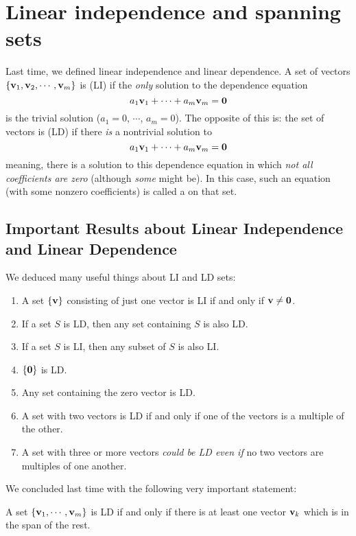 \chapter{Linear independence and spanning sets}

\label{Chapter:08independence_span}

Last time, we defined linear independence and linear dependence.
A set of vectors $\{ \mathbf{v}_1, \mathbf{v}_2, \cdots, \mathbf{v}_m\}$ 
is  (LI) if the \emph{only}
solution to the dependence equation
$$
a_1\mathbf{v}_1+\cdots +a_m\mathbf{v}_m = \mathbf{0}
$$
is the trivial solution ($a_1=0$, $\cdots$, $a_m=0$).  The opposite
of this is:  the set of vectors is  (LD)
if there \emph{is} a nontrivial solution to 
$$
a_1\mathbf{v}_1+\cdots +a_m\mathbf{v}_m = \mathbf{0}
$$
meaning, there is a solution to this dependence equation in which
\emph{not all coefficients are zero} (although \emph{some} might
be).  In this case, such an equation (with some nonzero coefficients)
is called a  on that set.

\section{Important Results about Linear Independence and Linear Dependence}

We deduced many useful things about LI and LD sets:
\begin{enumerate}
\item A set $\{ \mathbf{v}\}$ consisting of just one vector is LI if and only if $\mathbf{v} \neq \mathbf{0}$.
\item If a set $S$ is LD, then any set containing $S$ is also LD.
\item If a set $S$ is LI, then any subset of $S$ is also LI.
\item $\{\mathbf{0}\}$ is LD.
\item Any set containing the zero vector is LD. 
\item A set with two vectors is LD if and only if one of the vectors
is a multiple of the other.
\item A set with three or more vectors \emph{could be LD even if} no
two vectors are multiples of one another.
\end{enumerate}

We concluded last time with the following very important statement:

\begin{theorem}\label{depspan} 
A set $\{\mathbf{v}_1, \cdots, \mathbf{v}_m\}$ is LD if and only if there is at least
one vector $\mathbf{v}_k$  which is in the span of the rest.
\end{theorem}

